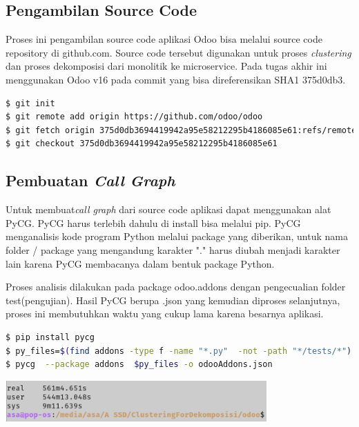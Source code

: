 \subsection{Pengambilan Source Code}
Proses ini pengambilan source code aplikasi Odoo bisa melalui source code repository di github.com. Source code tersebut digunakan untuk proses \textit{clustering} dan proses dekomposisi dari monolitik ke microservice. Pada tugas akhir ini menggunakan Odoo v16 pada commit yang bisa direferensikan SHA1 375d0db3. 
\begin{lstlisting}[style=mystyle, language=sh, caption={Shell Script Git untuk pengambilan source code}]
$ git init
$ git remote add origin https://github.com/odoo/odoo
$ git fetch origin 375d0db3694419942a95e58212295b4186085e61:refs/remotes/origin/16.0 --depth=1
$ git checkout 375d0db3694419942a95e58212295b4186085e61
\end{lstlisting} 

\subsection{Pembuatan \textit{Call Graph}}
Untuk membuat\textit{call graph} dari source code aplikasi dapat menggunakan alat PyCG. PyCG harus terlebih dahulu di install bisa melalui pip. PyCG menganalisis kode program Python melalui package yang diberikan, untuk nama folder / package yang mengandung karakter "." harus diubah menjadi karakter lain karena PyCG membacanya dalam bentuk package Python. 

Proses analisis  dilakukan pada package odoo.addons dengan pengecualian folder test(pengujian). Hasil PyCG berupa .json yang kemudian diproses selanjutnya, proses ini membutuhkan waktu yang cukup lama karena besarnya aplikasi.
\begin{lstlisting}[style=mystyle, language=sh, caption={Shell Script untuk pembuatan\textit{call graph}}]
$ pip install pycg
$ py_files=$(find addons -type f -name "*.py"  -not -path "*/tests/*")
$ pycg  --package addons  $py_files -o odooAddons.json
\end{lstlisting}

\begin{center}
	\includegraphics[width=10cm]{img/bab_4/hasil_run_pycg.png}
	\label{fig:hasil_run_pycg}
\end{center}

